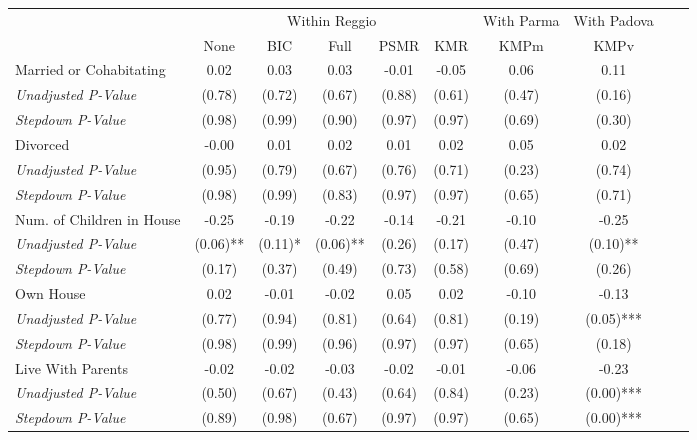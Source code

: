 \begin{tabular}{l c c c c c c c c c}
\toprule
& \multicolumn{5}{c}{Within Reggio} & With Parma & With Padova \\\cmidrule(lr){2-6} \cmidrule(lr){7} \cmidrule(lr){8}
 & None & BIC & Full & PSMR & KMR & KMPm & KMPv \\
\midrule
Married or Cohabitating & 0.02 & 0.03 & 0.03 & -0.01 & -0.05 & 0.06 & 0.11 \\
\quad \textit{Unadjusted P-Value} & (0.78) & (0.72) & (0.67) & (0.88) & (0.61) & (0.47) & (0.16) \\
\quad \textit{Stepdown P-Value} & (0.98) & (0.99) & (0.90) & (0.97) & (0.97) & (0.69) & (0.30) \\
Divorced & -0.00 & 0.01 & 0.02 & 0.01 & 0.02 & 0.05 & 0.02 \\
\quad \textit{Unadjusted P-Value} & (0.95) & (0.79) & (0.67) & (0.76) & (0.71) & (0.23) & (0.74) \\
\quad \textit{Stepdown P-Value} & (0.98) & (0.99) & (0.83) & (0.97) & (0.97) & (0.65) & (0.71) \\
Num. of Children in House & -0.25 & -0.19 & -0.22 & -0.14 & -0.21 & -0.10 & -0.25 \\
\quad \textit{Unadjusted P-Value} & (0.06)** & (0.11)* & (0.06)** & (0.26) & (0.17) & (0.47) & (0.10)** \\
\quad \textit{Stepdown P-Value} & (0.17) & (0.37) & (0.49) & (0.73) & (0.58) & (0.69) & (0.26) \\
Own House & 0.02 & -0.01 & -0.02 & 0.05 & 0.02 & -0.10 & -0.13 \\
\quad \textit{Unadjusted P-Value} & (0.77) & (0.94) & (0.81) & (0.64) & (0.81) & (0.19) & (0.05)*** \\
\quad \textit{Stepdown P-Value} & (0.98) & (0.99) & (0.96) & (0.97) & (0.97) & (0.65) & (0.18) \\
Live With Parents & -0.02 & -0.02 & -0.03 & -0.02 & -0.01 & -0.06 & -0.23 \\
\quad \textit{Unadjusted P-Value} & (0.50) & (0.67) & (0.43) & (0.64) & (0.84) & (0.23) & (0.00)*** \\
\quad \textit{Stepdown P-Value} & (0.89) & (0.98) & (0.67) & (0.97) & (0.97) & (0.65) & (0.00)*** \\
\bottomrule
\end{tabular}
